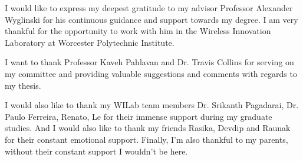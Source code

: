 I would like to express my deepest gratitude to my advisor Professor Alexander Wyglinski for his continuous guidance and support towards my degree. I am very thankful for the opportunity to work with him in the Wireless Innovation Laboratory at Worcester Polytechnic Institute. 

I want to thank Professor Kaveh Pahlavan and Dr. Travis Collins for serving on my committee and providing valuable suggestions and comments with regards to my thesis. 

I would also like to thank my WILab team members Dr. Srikanth Pagadarai, Dr. Paulo Ferreira, Renato, Le for their immense support during my graduate studies. And I would also like to thank my friends Rasika, Devdip and Raunak for their constant emotional support. Finally, I'm also thankful to my parents, without their constant support I wouldn't be here.

 